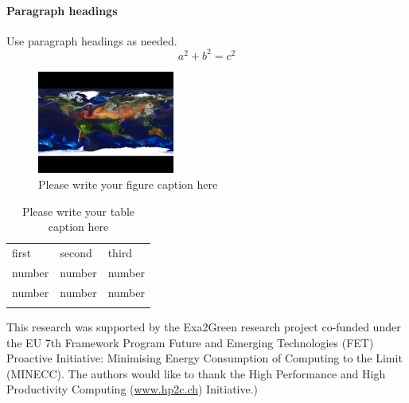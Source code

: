 \documentclass[twocolumn]{svjour3}           %
\DeclareRobustCommand\IPCClongname{}
\begin{document}
\paragraph{Paragraph headings} Use paragraph headings as needed.
\begin{equation}
  a^2+b^2=c^2
\end{equation}

\begin{figure}
  \includegraphics[width=0.4\textwidth]{Figs/earth.eps}
  \caption{Please write your figure caption here}
  \label{fig:1}
\end{figure}

\begin{table}
  \caption{Please write your table caption here}
  \label{tab:1}
  \begin{tabular}{lll}
    \hline\noalign{\smallskip}
    first & second & third  \\
    \noalign{\smallskip}\hline\noalign{\smallskip}
    number & number & number \\
    number & number & number \\
    \noalign{\smallskip}\hline
  \end{tabular}
\end{table}

\begin{acknowledgements}
This  research  was  supported   by  the  Exa2Green  research  project
co-funded  under the  EU  7th Framework  Program  Future and  Emerging
Technologies (FET) Proactive Initiative: Minimising Energy Consumption
of Computing to  the Limit (MINECC).  The authors  would like to thank
the    High    Performance    and    High    Productivity    Computing
(\url{www.hp2c.ch}) Initiative.)
\end{acknowledgements}

\DeclareRobustCommand\IPCClongname{ Intergovernmental Panel on Climate Change}



\end{document}
